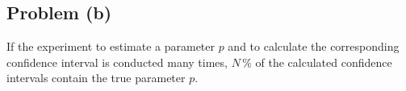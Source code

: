 \subsection*{Problem (b)}

If the experiment to estimate a parameter $p$ and to calculate the
corresponding confidence interval is conducted many times, $N\,\%$
of the calculated confidence intervals contain the true parameter
$p$.